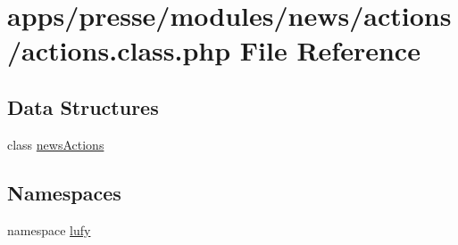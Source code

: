 \hypertarget{presse_2modules_2news_2actions_2actions_8class_8php}{\section{apps/presse/modules/news/actions/actions.class.\-php File Reference}
\label{presse_2modules_2news_2actions_2actions_8class_8php}
}
\subsection*{Data Structures}
\begin{DoxyCompactItemize}
\item 
class \hyperlink{classnews_actions}{news\-Actions}
\end{DoxyCompactItemize}
\subsection*{Namespaces}
\begin{DoxyCompactItemize}
\item 
namespace \hyperlink{namespacelufy}{lufy}
\end{DoxyCompactItemize}
